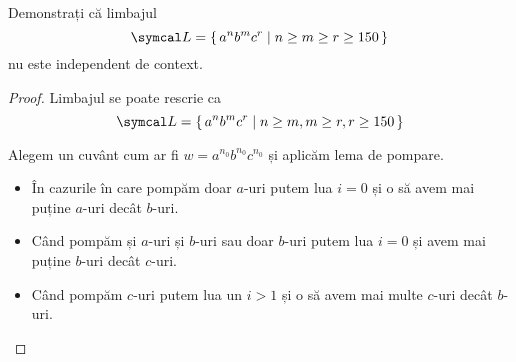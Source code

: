 \begin{exercise}
    Demonstrați că limbajul
    \[\lang = \set{ a^n b^m c^r | n \geq m \geq r \geq 150 }\]
    nu este independent de context.
\end{exercise}
\begin{proof}
    Limbajul se poate rescrie ca
    \[\lang = \set{ a^n b^m c^r | n \geq m, m \geq r, r \geq 150 }\]

    Alegem un cuvânt cum ar fi \(w = a^{n_0} b^{n_0} c^{n_0}\) și aplicăm lema de pompare.

    \begin{itemize}
        \item În cazurile în care pompăm doar \(a\)-uri putem lua \(i = 0\) și o să avem mai puține \(a\)-uri decât \(b\)-uri.
        \item Când pompăm și \(a\)-uri și \(b\)-uri sau doar \(b\)-uri putem lua \(i = 0\) și avem mai puține \(b\)-uri decât \(c\)-uri.
        \item Când pompăm \(c\)-uri putem lua un \(i > 1\) și o să avem mai multe \(c\)-uri decât \(b\)-uri.
    \end{itemize}
\end{proof}
